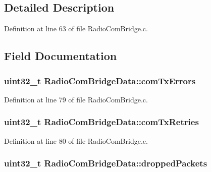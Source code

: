 \subsection{\-Detailed \-Description}


\-Definition at line 63 of file \-Radio\-Com\-Bridge.\-c.



\subsection{\-Field \-Documentation}
\hypertarget{struct_radio_com_bridge_data_a70614241d844e1b9501d0ba2fee0d2a3}{
\subsubsection[{com\-Tx\-Errors}]{\setlength{\rightskip}{0pt plus 5cm}uint32\-\_\-t {\bf \-Radio\-Com\-Bridge\-Data\-::com\-Tx\-Errors}}}\label{struct_radio_com_bridge_data_a70614241d844e1b9501d0ba2fee0d2a3}


\-Definition at line 79 of file \-Radio\-Com\-Bridge.\-c.

\hypertarget{struct_radio_com_bridge_data_a392e64420cac274586464b5173287ddd}{
\subsubsection[{com\-Tx\-Retries}]{\setlength{\rightskip}{0pt plus 5cm}uint32\-\_\-t {\bf \-Radio\-Com\-Bridge\-Data\-::com\-Tx\-Retries}}}\label{struct_radio_com_bridge_data_a392e64420cac274586464b5173287ddd}


\-Definition at line 80 of file \-Radio\-Com\-Bridge.\-c.

\hypertarget{struct_radio_com_bridge_data_afe94f8af161cf4629a276387f1b0bca6}{
\subsubsection[{dropped\-Packets}]{\setlength{\rightskip}{0pt plus 5cm}uint32\-\_\-t {\bf \-Radio\-Com\-Bridge\-Data\-::dropped\-Packets}}}\label{struct_radio_com_bridge_data_afe94f8af161cf4629a276387f1b0bca6}


